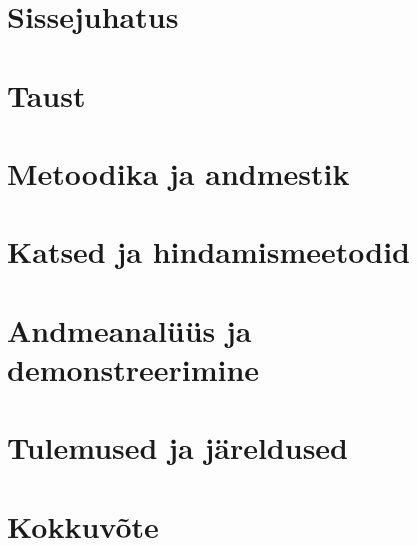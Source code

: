

\chapter{Sissejuhatus}\label{chapter:introduction} %

\chapter{Taust}\label{chapter:method}


\chapter{Metoodika ja andmestik}\label{chapter:method}


\chapter{Katsed ja hindamismeetodid}\label{chapter:discussion}


\chapter{Andmeanalüüs ja demonstreerimine}\label{chapter:discussion}


\chapter{Tulemused ja järeldused}\label{chapter:result}


\chapter{Kokkuvõte}\label{chapter:summary} 


